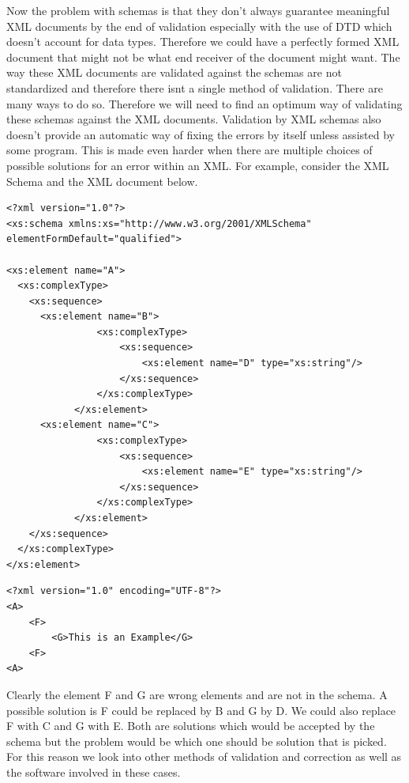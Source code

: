\documentclass{report}
\begin{document}
Now the problem with schemas is that they don't always guarantee meaningful XML documents by the end of validation especially with the use of DTD which doesn't account for data types. Therefore we could have a perfectly formed XML document that might not be what end receiver of the document might want. The way these XML documents are validated against the schemas are not standardized and therefore there isnt a single method of validation. There are many ways to do so. Therefore we will need to find an optimum way of validating these schemas against the XML documents. Validation by XML schemas also doesn't provide an automatic way of fixing the errors by itself unless assisted by some program. This is made even harder when there are multiple choices of possible solutions for an error within an XML. For example, consider the XML Schema and the XML document below.

\noindent\begin{minipage}{.45\textwidth}
\begin {lstlisting}[caption=XML Schema,frame=tlrb]
<?xml version="1.0"?>
<xs:schema xmlns:xs="http://www.w3.org/2001/XMLSchema"
elementFormDefault="qualified">

<xs:element name="A">
  <xs:complexType>
    <xs:sequence>
      <xs:element name="B">
				<xs:complexType>
					<xs:sequence>
						<xs:element name="D" type="xs:string"/>
					</xs:sequence>
				</xs:complexType>
			</xs:element>
      <xs:element name="C">
				<xs:complexType>
					<xs:sequence>
						<xs:element name="E" type="xs:string"/>
					</xs:sequence>
				</xs:complexType>
			</xs:element>
    </xs:sequence>
  </xs:complexType>
</xs:element>
\end{lstlisting}
\end{minipage}\hfill
\begin{minipage}{.45\textwidth}
\begin {lstlisting}[caption=XML Document,frame=tlrb]
<?xml version="1.0" encoding="UTF-8"?>
<A>
	<F>
		<G>This is an Example</G>
	<F>
<A>
\end{lstlisting}
\end{minipage}
Clearly the element F and G are wrong elements and are not in the schema. A possible solution is F could be replaced by B and G by D. We could also replace F with C and G with E. Both are solutions which would be accepted by the schema but the problem would be which one should be solution that is picked. For this reason we look into other methods of validation and correction as well as the software involved in these cases.
\end{document}
